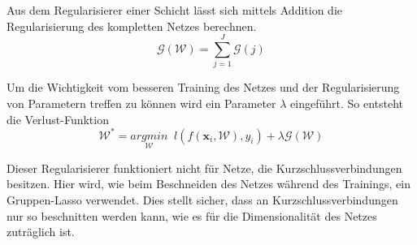 Aus dem Regularisierer einer Schicht lässt sich mittels Addition die Regularisierung des kompletten Netzes berechnen.
\begin{equation}
 \mathcal{G}(\mathcal{W})=\sum_{j=1}^{J} \mathcal{G}(j)
\end{equation}


Um die Wichtigkeit vom besseren Training des Netzes und der Regularisierung von Parametern treffen zu können wird ein Parameter $\lambda$ eingeführt. So entsteht die Verlust-Funktion
\begin{equation}
 \mathcal{W}^{\ast}=\underset{\mathcal{W}}{arg min}\; \; l(f(\mathbf{x}_i, \mathcal{W}),y_i) + \lambda \mathcal{G}(\mathcal{W})
\end{equation}



Dieser Regularisierer funktioniert nicht für Netze, die Kurzschlussverbindungen besitzen. Hier wird, wie beim Beschneiden des Netzes während des Trainings, ein Gruppen-Lasso verwendet. Dies stellt sicher, dass an Kurzschlussverbindungen nur so beschnitten werden kann, wie es für die Dimensionalität des Netzes zuträglich ist.





